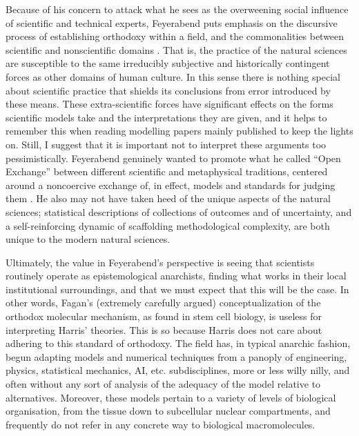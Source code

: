 Because of his concern to attack what he sees as the overweening social influence of scientific and technical experts, Feyerabend puts emphasis on the discursive process of establishing orthodoxy within a field, and the commonalities between scientific and nonscientific domains \cite{Feyerabend1975,Feyerabend1981,Feyerabend1993}. That is, the practice of the natural sciences are susceptible to the same irreducibly subjective and historically contingent forces as other domains of human culture. In this sense there is nothing special about scientific practice that shields its conclusions from error introduced by these means. These extra-scientific forces have significant effects on the forms scientific models take and the interpretations they are given, and it helps to remember this when reading modelling papers mainly published to keep the lights on. Still, I suggest that it is important not to interpret these arguments too pessimistically. Feyerabend genuinely wanted to promote what he called ``Open Exchange'' between different scientific and metaphysical traditions, centered around a noncoercive exchange of, in effect, models and standards for judging them \cite{Feyerabend1993}. He also may not have taken heed of the unique aspects of the natural sciences; statistical descriptions of collections of outcomes and of uncertainty, and a self-reinforcing dynamic of scaffolding methodological complexity, are both unique to the modern natural sciences.

Ultimately, the value in Feyerabend's perspective is seeing that scientists routinely operate as epistemological anarchists, finding what works in their local institutional surroundings, and that we must expect that this will be the case. In other words, Fagan's (extremely carefully argued) conceptualization of the orthodox molecular mechanism, as found in stem cell biology, is useless for interpreting Harris' theories. This is so because Harris does not care about adhering to this standard of orthodoxy. The field has, in typical anarchic fashion, begun adapting models and numerical techniques from a panoply of engineering, physics, statistical mechanics, AI, etc. subdisciplines, more or less willy nilly, and often without any sort of analysis of the adequacy of the model relative to alternatives. Moreover, these models pertain to a variety of levels of biological organisation, from the tissue down to subcellular nuclear compartments, and frequently do not refer in any concrete way to biological macromolecules.


